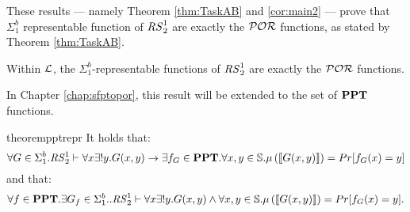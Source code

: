 These results --- namely Theorem \ref{thm:TaskAB} and \ref{cor:main2} --- prove that $\Sigma^b_1$ representable function of ${\mathit{RS}^1_2}$ are exactly the $\mathcal{POR}$ functions, as stated by Theorem \ref{thm:TaskAB}.

\begin{theorem}
  \label{thm:TaskAB}
  Within $\mathcal{L}$, the $\Sigma^b_1$-representable functions of ${\mathit{RS}^1_2}$ are exactly the
  $\mathcal{POR}$ functions.
\end{theorem}
\noindent
In Chapter \ref{chap:sfptopor}, this result will be extended to the set of $\mathbf{PPT}$
functions.

\begin{restatable}{theorem}{pptrepr}
  \label{thm:TaskABC}
  It holds that:
  \[
  \forall G \in \Sigma^b_1.{\mathit{RS}^1_2} \vdash \forall x \exists ! y. G(x, y) \to \exists f_G \in \mathbf{PPT}. \forall x, y \in \mathbb{S}.\mu\left(\llbracket G(x, y) \rrbracket\right)=Pr[f_G(x)=y]
  \]
  \noindent
  and that:
  \[
  \forall f \in \mathbf{PPT}.\exists G_f \in \Sigma^b_1. .{\mathit{RS}^1_2} \vdash \forall x \exists ! y. G(x, y)\land \forall x, y \in \mathbb{S}.\mu\left(\llbracket G(x, y) \rrbracket\right)=Pr[f_G(x)=y].
  \]
\end{restatable}
